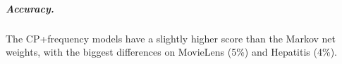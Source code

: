 \documentclass[twoside,leqno,twocolumn]{article}
\begin{document}

\subparagraph{Accuracy.} 
The CP+frequency models have a slightly higher score than the Markov net weights, with the biggest differences on MovieLens (5\%) and Hepatitis (4\%). 




%
%
%


\end{document}
